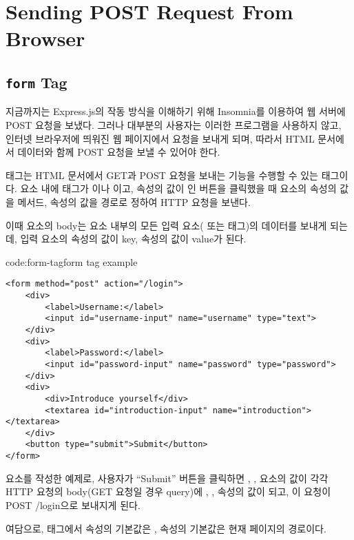 \section{Sending POST Request From Browser}\label{sect:browser-post-request}

\subsection*{\texttt{form} Tag}

지금까지는 Express.js의 작동 방식을 이해하기 위해 Insomnia를 이용하여 웹 서버에 POST 요청을 보냈다. 그러나 대부분의 사용자는 이러한 프로그램을 사용하지 않고, 인터넷 브라우저에 띄워진 웹 페이지에서 요청을 보내게 되며, 따라서 HTML 문서에서  데이터와 함께 POST 요청을 보낼 수 있어야 한다.

 태그는 HTML 문서에서 GET과 POST 요청을 보내는 기능을 수행할 수 있는 태그이다.  요소 내에 태그가 이나 이고,  속성의 값이 인 버튼을 클릭했을 때  요소의  속성의 값을 메서드,  속성의 값을 경로로 정하여 HTTP 요청을 보낸다.

이때  요소의 body는 요소 내부의 모든 입력 요소( 또는  태그)의 데이터를 보내게 되는데, 입력 요소의  속성의 값이 key,  속성의 값이 value가 된다.

\begin{code}{code:form-tag}{form tag example}
\begin{verbatim}
<form method="post" action="/login">
    <div>
        <label>Username:</label>
        <input id="username-input" name="username" type="text">
    </div>
    <div>
        <label>Password:</label>
        <input id="password-input" name="password" type="password">
    </div>
    <div>
        <div>Introduce yourself</div>
        <textarea id="introduction-input" name="introduction"></textarea>
    </div>
    <button type="submit">Submit</button>
</form>
\end{verbatim}
\end{code}

\는  요소를 작성한 예제로, 사용자가 ``Submit'' 버튼을 클릭하면 , ,  요소의  값이 각각 HTTP 요청의 body(GET 요청일 경우 query)에 , ,  속성의 값이 되고, 이 요청이 POST /login으로 보내지게 된다.

여담으로,  태그에서  속성의 기본값은 ,  속성의 기본값은 현재 페이지의 경로이다.
